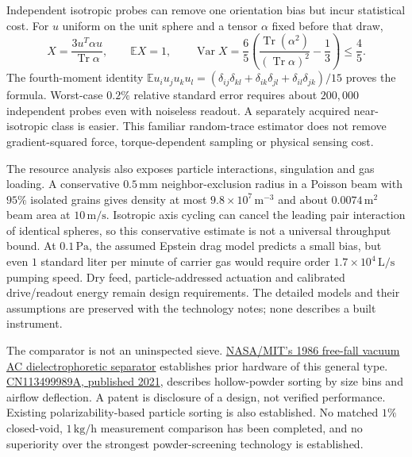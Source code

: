 \documentclass[11pt]{article}
\newcommand{\Tr}{\operatorname{Tr}}
\begin{document}
Independent isotropic probes can remove one orientation bias but incur statistical cost. For $u$ uniform on the unit sphere and a tensor $\alpha$ fixed before that draw,
\[
 X=\frac{3u^T\alpha u}{\Tr\alpha},\qquad
 \mathbb EX=1,\qquad
 \operatorname{Var}X=\frac65\left(
       \frac{\Tr(\alpha^2)}{(\Tr\alpha)^2}-\frac13\right)\le\frac45.
\]
The fourth-moment identity $\mathbb E u_i u_j u_k u_l=(\delta_{ij}\delta_{kl}+\delta_{ik}\delta_{jl}+\delta_{il}\delta_{jk})/15$ proves the formula. Worst-case $0.2\%$ relative standard error requires about $200{,}000$ independent probes even with noiseless readout. A separately acquired near-isotropic class is easier. This familiar random-trace estimator does not remove gradient-squared force, torque-dependent sampling or physical sensing cost.

The resource analysis also exposes particle interactions, singulation and gas loading. A conservative $0.5\,\mathrm{mm}$ neighbor-exclusion radius in a Poisson beam with $95\%$ isolated grains gives density at most $9.8\times10^7\,\mathrm{m^{-3}}$ and about $0.0074\,\mathrm{m^2}$ beam area at $10\,\mathrm{m/s}$. Isotropic axis cycling can cancel the leading pair interaction of identical spheres, so this conservative estimate is not a universal throughput bound. At $0.1\,\mathrm{Pa}$, the assumed Epstein drag model predicts a small bias, but even $1$ standard liter per minute of carrier gas would require order $1.7\times10^4\,\mathrm{L/s}$ pumping speed. Dry feed, particle-addressed actuation and calibrated drive/readout energy remain design requirements. The detailed models and their assumptions are preserved with the technology notes; none describes a built instrument.

The comparator is not an uninspected sieve. \href{https://ntrs.nasa.gov/citations/19890004301}{NASA/MIT's 1986 free-fall vacuum AC dielectrophoretic separator} establishes prior hardware of this general type. \href{https://patents.google.com/patent/CN113499989A/en}{CN113499989A, published 2021}, describes hollow-powder sorting by size bins and airflow deflection. A patent is disclosure of a design, not verified performance. Existing polarizability-based particle sorting is also established. No matched $1\%$ closed-void, $1\,\mathrm{kg/h}$ measurement comparison has been completed, and no superiority over the strongest powder-screening technology is established.
\end{document}
